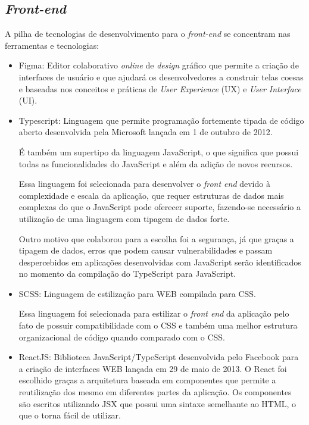 \documentclass[
    12pt,               %
    openright,          %
    oneside,
    a4paper,            %
    BIBLATEX,           %
    TODO,               %
    english,            %
    brazil              %
    ]{ifsp-spo-inf-ctds}
\begin{document}
    \subsection{\emph{Front-end}}
    
        A pilha de tecnologias de desenvolvimento para o \emph{front-end} se concentram nas ferramentas e tecnologias:
                
        \begin{itemize}
        
            \item Figma: Editor colaborativo \emph{online} de \emph{design} gráfico que permite a criação de interfaces de usuário e que ajudará os desenvolvedores a construir telas coesas e baseadas nos conceitos e práticas de \emph{User Experience} (UX) e \emph{User Interface} (UI).
        
            \item Typescript:
                Linguagem que permite programação fortemente tipada de código aberto desenvolvida pela Microsoft lançada em 1 de outubro de 2012. 
    
                É também um supertipo da linguagem  JavaScript, o que significa que possui todas as funcionalidades do JavaScript e além da adição de novos recursos. 
                
                Essa linguagem foi selecionada para desenvolver o \emph{front end} devido à complexidade e escala da aplicação, que requer estruturas de dados mais complexas do que o JavaScript pode oferecer suporte, fazendo-se necessário a utilização de uma linguagem com tipagem de dados forte. 
                
                Outro motivo que colaborou para a escolha foi a segurança, já que graças a tipagem de dados, erros que podem causar vulnerabilidades e passam despercebidos em aplicações desenvolvidas com JavaScript serão identificados no momento da compilação do TypeScript para JavaScript.
            
            \item SCSS:
                Linguagem de estilização para WEB compilada para CSS.
    
                Essa linguagem foi selecionada para estilizar o \emph{front end} da aplicação pelo fato de possuir compatibilidade com o CSS e também uma melhor estrutura organizacional de código quando comparado com o CSS.
        
            \item ReactJS:
                Biblioteca JavaScript/TypeScript desenvolvida pelo Facebook para a criação de interfaces WEB lançada em 29 de maio de 2013. O React foi escolhido graças a arquitetura baseada em componentes que permite a reutilização dos mesmo em diferentes partes da aplicação. Os componentes são escritos utilizando JSX que possui uma sintaxe semelhante ao HTML, o que o torna fácil de utilizar.
        

\end{itemize}
\end{document}
